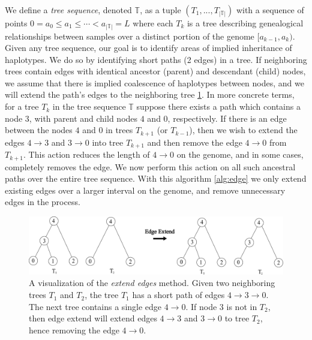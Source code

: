 \documentclass[10pt,twoside,lineno]{gsajnl}
\newcommand{\T}{\mathbb{T}}
\begin{document}
    We define a \textit{tree sequence}, denoted $\T$, 
    as a tuple $\left(T_1,...,T_{|\T|}\right)$ with a sequence of points
	$0 = a_0 \leq a_1 \leq \cdots < a_{|\T|} = L$ where
     each $T_k$ is a tree describing genealogical relationships between samples
     over a distinct portion of the genome $[a_{k-1}, a_k)$.
    Given any tree sequence, our goal is to
    identify areas of implied inheritance of haplotypes.
    We do so by identifying short paths (2 edges) in a tree.
    If neighboring trees contain edges with 
    identical ancestor (parent) and descendant (child) nodes, 
    we assume that there is implied coalescence of haplotypes between nodes, 
    and we will extend the path's edges to the neighboring tree \ref{fig:extending_diagram}.
  	In more concrete terms, for a tree $T_k$ in the tree sequence $\T$ 
    suppose there exists a path which contains a node $3$,
    with parent and child nodes $4$ and $0$, respectively.
    If there is an edge between the nodes $4$ and $0$ in trees 
    $T_{k+1}$ (or $T_{k-1}$),
    then we wish to extend the edges $4\to 3$ and $3\to 0$ 
    into tree $T_{k+1}$ and then remove the edge $4 \to 0$ from $T_{k+1}$. 
    This action reduces the length of $4 \to 0$ on the genome,
    and in some cases, completely removes the edge. 
    We now perform this action on all such ancestral paths 
    over the entire tree sequence.
    With this algorithm \ref{alg:edge} we only extend existing edges
    over a larger interval on the genome,
    and remove unnecessary edges in the process.

\begin{figure}[!ht]
\begin{center}
	\includegraphics[width=5in]{edge_extend_method.pdf}
\end{center}
\caption{A visualization of the \textit{extend edges} method. Given two neighboring trees $T_1$ and $T_2$, the tree $T_1$ has a short path of edges $4 \to 3\to0$. The next tree contains a single edge $4 \to 0$. If node $3$ is not in $T_2$, then edge extend will extend edges $ 4\to 3$ and $3\to 0$ to tree $T_2$, hence removing the edge $4\to 0$. 
    \label{fig:extending_diagram}
}
\end{figure}
\end{document}
